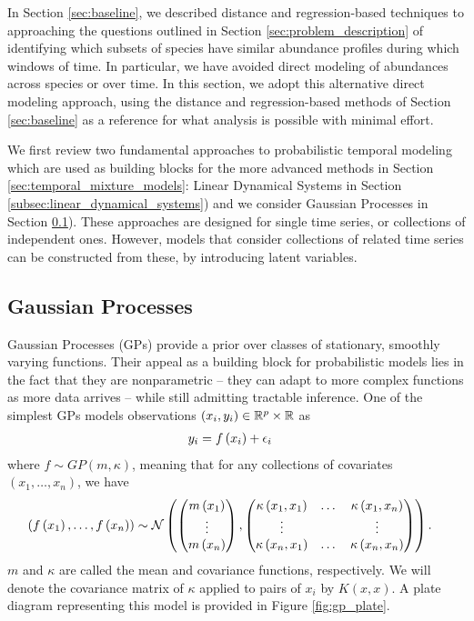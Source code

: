 \documentclass[14pt]{extarticle}
\begin{document}
In Section \ref{sec:baseline}, we described distance and regression-based
techniques to approaching the questions outlined in Section
\ref{sec:problem_description} of identifying which subsets of species have
similar abundance profiles during which windows of time. In particular, we have
avoided direct modeling of abundances across species or over time. In this
section, we adopt this alternative direct modeling approach, using the distance
and regression-based methods of Section \ref{sec:baseline} as a reference for
what analysis is possible with minimal effort.

We first review two fundamental approaches to probabilistic temporal modeling
which are used as building blocks for the more advanced methods in Section
\ref{sec:temporal_mixture_models}: Linear Dynamical Systems in Section
\ref{subsec:linear_dynamical_systems}) and we consider Gaussian Processes in
Section \ref{subsec:gaussian_processes}). These approaches are designed for
single time series, or collections of independent ones. However, models that
consider collections of related time series can be constructed from these, by
introducing latent variables.

\subsection{Gaussian Processes}
\label{subsec:gaussian_processes}

Gaussian Processes (GPs) provide a prior over classes of stationary, smoothly
varying functions. Their appeal as a building block for probabilistic models
lies in the fact that they are nonparametric -- they can adapt to more complex
functions as more data arrives -- while still admitting tractable inference. One
of the simplest GPs models observations $\left(x_{i}, y_{i}\right) \in
\mathbb{R}^{p}\times \mathbb{R}$ as
\begin{align*}
  y_{i} &= f\left(x_{i}\right) + \epsilon_{i}
\end{align*}
where $f \sim GP\left(m, \kappa\right)$, meaning that for any collections of
covariates $\left(x_{1}, \dots, x_{n}\right)$, we have
\begin{align*}
  \left(f\left(x_{1}\right), \dots, f\left(x_{n}\right)\right) &\sim
  \mathcal{N}\left( \begin{pmatrix} m\left(x_{1}\right) \\ \vdots \\ m\left(x_{n}\right) \end{pmatrix}, \begin{pmatrix} \kappa\left(x_{1}, x_{1}\right) & \dots & \kappa\left(x_{1}, x_{n}\right) \\ \vdots & & \vdots \\ \kappa\left(x_{n}, x_{1}\right) & \dots &\kappa\left(x_{n}, x_{n}\right) \end{pmatrix}\right).
\end{align*}
$m$ and $\kappa$ are called the mean and covariance functions, respectively. We
will denote the covariance matrix of $\kappa$ applied to pairs of $x_{i}$ by
$K\left(x, x\right)$. A plate diagram representing this model is provided in
Figure \ref{fig:gp_plate}.
\end{document}
